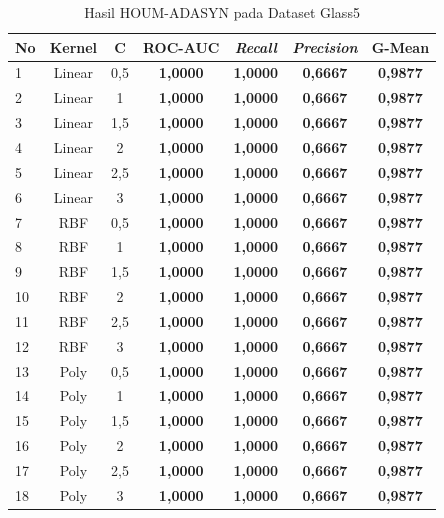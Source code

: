 \begin{table}[H]
\centering
\caption{Hasil HOUM-ADASYN pada Dataset Glass5}
\label{table:4.adasyn_glass}
\footnotesize
\begin{tabular}{|l|c|c|c|c|c|c|}
\hline
\textbf{No} & \textbf{Kernel} & \textbf{C} & \textbf{ROC-AUC} & \textbf{\textit{Recall}} & \textbf{\textit{Precision}} & \textbf{G-Mean} \\
\hline
1 & Linear & 0,5 & \textbf{1,0000} & \textbf{1,0000} & \textbf{0,6667} & \textbf{0,9877} \\
\hline
2 & Linear & 1 & \textbf{1,0000} & \textbf{1,0000} & \textbf{0,6667} & \textbf{0,9877} \\
\hline
3 & Linear & 1,5 & \textbf{1,0000} & \textbf{1,0000} & \textbf{0,6667} & \textbf{0,9877} \\
\hline
4 & Linear & 2 & \textbf{1,0000} & \textbf{1,0000} & \textbf{0,6667} & \textbf{0,9877} \\
\hline
5 & Linear & 2,5 & \textbf{1,0000} & \textbf{1,0000} & \textbf{0,6667} & \textbf{0,9877} \\
\hline
6 & Linear & 3 & \textbf{1,0000} & \textbf{1,0000} & \textbf{0,6667} & \textbf{0,9877} \\
\hline
7 & RBF & 0,5 & \textbf{1,0000} & \textbf{1,0000} & \textbf{0,6667} & \textbf{0,9877} \\
\hline
8 & RBF & 1 & \textbf{1,0000} & \textbf{1,0000} & \textbf{0,6667} & \textbf{0,9877} \\
\hline
9 & RBF & 1,5 & \textbf{1,0000} & \textbf{1,0000} & \textbf{0,6667} & \textbf{0,9877} \\
\hline
10 & RBF & 2 & \textbf{1,0000} & \textbf{1,0000} & \textbf{0,6667} & \textbf{0,9877} \\
\hline
11 & RBF & 2,5 & \textbf{1,0000} & \textbf{1,0000} & \textbf{0,6667} & \textbf{0,9877} \\
\hline
12 & RBF & 3 & \textbf{1,0000} & \textbf{1,0000} & \textbf{0,6667} & \textbf{0,9877} \\
\hline
13 & Poly & 0,5 & \textbf{1,0000} & \textbf{1,0000} & \textbf{0,6667} & \textbf{0,9877} \\
\hline
14 & Poly & 1 & \textbf{1,0000} & \textbf{1,0000} & \textbf{0,6667} & \textbf{0,9877} \\
\hline
15 & Poly & 1,5 & \textbf{1,0000} & \textbf{1,0000} & \textbf{0,6667} & \textbf{0,9877} \\
\hline
16 & Poly & 2 & \textbf{1,0000} & \textbf{1,0000} & \textbf{0,6667} & \textbf{0,9877} \\
\hline
17 & Poly & 2,5 & \textbf{1,0000} & \textbf{1,0000} & \textbf{0,6667} & \textbf{0,9877} \\
\hline
18 & Poly & 3 & \textbf{1,0000} & \textbf{1,0000} & \textbf{0,6667} & \textbf{0,9877} \\
\hline
\end{tabular}
\end{table}

